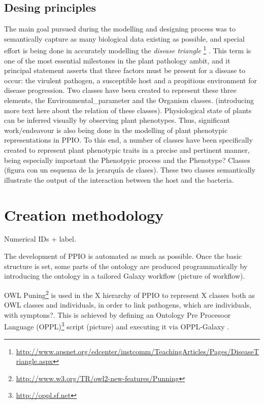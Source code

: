 \documentclass[sw]{iosart2c}
\newcommand{\myurl}[1]{\footnote{\url{#1}}}
\begin{document}
\subsection{Desing principles}

The main goal pursued during the modelling and designing process was to semantically capture as many biological data existing as possible, and special effort is being done in accurately modelling the {\itshape disease triangle} \myurl{http://www.apsnet.org/edcenter/instcomm/TeachingArticles/Pages/DiseaseTriangle.aspx} . This term is one of the most essential milestones in the plant pathology ambit, and it principal statement asserts that three factors must be present for a disease to occur: the virulent pathogen, a susceptible host and a propitious environment for disease progression. Two classes have been created to represent these three elements, the {\sf Environmental\_parameter} and the {\sf Organism} classes. (introducing more text here about the relation of these classes).
Physiological state of plants can be inferred visually by observing plant phenotypes. Thus, significant work/endeavour is also being done in the modelling of plant phenotypic representations in PPIO. To this end, a number of classes have been specifically created to represent plant phenotypic traits in a precise and pertinent manner, being especially important the Phenotpyic process and the Phenotype? Classes (figura con un esquema de la jerarquía de clases). These two classes semantically illustrate the output of the interaction between the host and the bacteria. 


\section{Creation methodology}

Numerical IDs + label.

The development of PPIO is automated as much as possible. Once the basic structure is set, some parts of the ontology are produced programmatically by introducing the ontology in a tailored Galaxy \cite{galaxy} workflow  (picture of workflow). 

OWL Puning\myurl{http://www.w3.org/TR/owl2-new-features/Punning} is used in the X hierarchy of PPIO to represent X classes both as OWL classes and individuals, in order to link pathogens, which are individuals, with symptons?. This is achieved by defining an Ontology Pre Procesoor Language (OPPL)\myurl{http://oppl.sf.net} script (picture) and executing it via OPPL-Galaxy \cite{OPPL-Galaxy-JBMS}.
\end{document}
